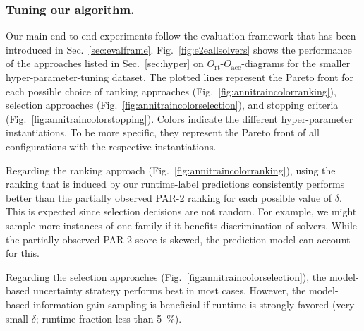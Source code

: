 \documentclass[runningheads]{llncs}
\begin{document}
\subsubsection{Tuning our algorithm.}
Our main end-to-end experiments follow the evaluation framework that has been introduced in Sec.~\ref{sec:evalframe}.
Fig.~\ref{fig:e2eallsolvers} shows the performance of the approaches listed in Sec.~\ref{sec:hyper} on $O_{\operatorname{rt}}$-$O_{\operatorname{acc}}$-diagrams for the smaller hyper-parameter-tuning dataset.
The plotted lines represent the Pareto front for each possible choice of ranking approaches (Fig.~\ref{fig:annitraincolorranking}), selection approaches (Fig.~\ref{fig:annitraincolorselection}), and stopping criteria (Fig.~\ref{fig:annitraincolorstopping}).
Colors indicate the different hyper-parameter instantiations.
To be more specific, they represent the Pareto front of all configurations with the respective instantiations.

Regarding the ranking approach (Fig.~\ref{fig:annitraincolorranking}), using the ranking that is induced by our runtime-label predictions consistently performs better than the partially observed PAR-2 ranking for each possible value of $\delta$.
This is expected since selection decisions are not random.
For example, we might sample more instances of one family if it benefits discrimination of solvers.
While the partially observed PAR-2 score is skewed, the prediction model can account for this.

Regarding the selection approaches (Fig.~\ref{fig:annitraincolorselection}), the model-based uncertainty strategy performs best in most cases.
However, the model-based information-gain sampling is beneficial if runtime is strongly favored (very small $\delta$; runtime fraction less than \SI{5}{\%}).
\end{document}
